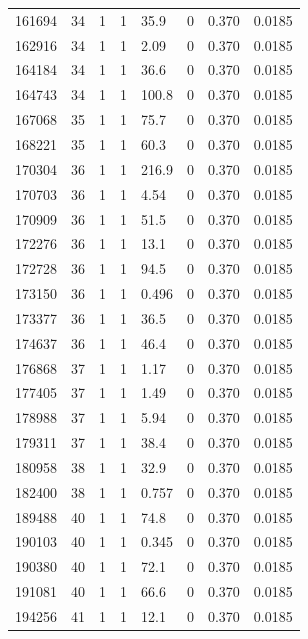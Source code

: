 \documentclass[preview]{standalone}
\begin{document}
{{{{{{{{{{{{{{{{{\begin{tabular}{L{1.2cm}C{1.2cm} C{0.3cm}C{0.5cm} C{1.4cm}C{1.4cm} C{1.4cm}C{1.4cm}}
  161694  &    34  & 1     &  1 &  35.9  & 0  & 0.370 &  0.0185   \\ 
  162916  &    34  & 1     &  1 &  2.09  & 0  & 0.370 &  0.0185   \\ 
  164184  &    34  & 1     &  1 &  36.6  & 0  & 0.370 &  0.0185   \\ 
  164743  &    34  & 1     &  1 &  100.8  & 0  & 0.370 &  0.0185   \\ 
  167068  &    35  & 1     &  1 &  75.7  & 0  & 0.370 &  0.0185   \\ 
  168221  &    35  & 1     &  1 &  60.3  & 0  & 0.370 &  0.0185   \\ 
  170304  &    36  & 1     &  1 &  216.9  & 0  & 0.370 &  0.0185   \\ 
  170703  &    36  & 1     &  1 &  4.54  & 0  & 0.370 &  0.0185   \\ 
  170909  &    36  & 1     &  1 &  51.5  & 0  & 0.370 &  0.0185   \\ 
  172276  &    36  & 1     &  1 &  13.1  & 0  & 0.370 &  0.0185   \\ 
  172728  &    36  & 1     &  1 &  94.5  & 0  & 0.370 &  0.0185   \\ 
  173150  &    36  & 1     &  1 &  0.496  & 0  & 0.370 &  0.0185   \\ 
  173377  &    36  & 1     &  1 &  36.5  & 0  & 0.370 &  0.0185   \\ 
  174637  &    36  & 1     &  1 &  46.4  & 0  & 0.370 &  0.0185   \\ 
  176868  &    37  & 1     &  1 &  1.17  & 0  & 0.370 &  0.0185   \\ 
  177405  &    37  & 1     &  1 &  1.49  & 0  & 0.370 &  0.0185   \\ 
  178988  &    37  & 1     &  1 &  5.94  & 0  & 0.370 &  0.0185   \\ 
  179311  &    37  & 1     &  1 &  38.4  & 0  & 0.370 &  0.0185   \\ 
  180958  &    38  & 1     &  1 &  32.9  & 0  & 0.370 &  0.0185   \\ 
  182400  &    38  & 1     &  1 &  0.757  & 0  & 0.370 &  0.0185   \\ 
  189488  &    40  & 1     &  1 &  74.8  & 0  & 0.370 &  0.0185   \\ 
  190103  &    40  & 1     &  1 &  0.345  & 0  & 0.370 &  0.0185   \\ 
  190380  &    40  & 1     &  1 &  72.1  & 0  & 0.370 &  0.0185   \\ 
  191081  &    40  & 1     &  1 &  66.6  & 0  & 0.370 &  0.0185   \\ 
  194256  &    41  & 1     &  1 &  12.1  & 0  & 0.370 &  0.0185   \\ 
\hline 
\end{tabular} 

}}}}}}}}}}}}}}}}}
\end{document}

